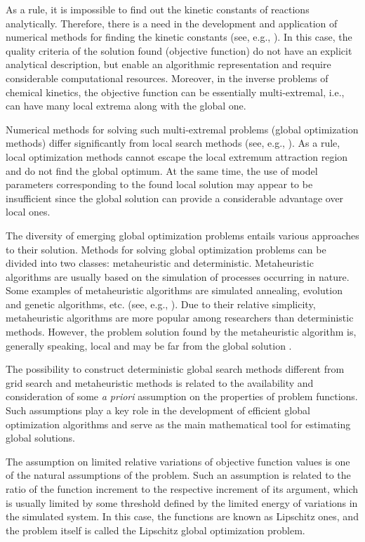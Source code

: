\documentclass{svproc}
\begin{document}
As a rule, it is impossible to find out the kinetic constants of reactions analytically. Therefore, there is a need in the development and application of numerical methods for finding the kinetic constants (see, e.g., \cite{Zaynullin2020,Enikeeva2020,Koledina2019,Enikeev2020,uskovfibrous,enikeeva2021,en13133393}). In this case, the quality criteria of the solution found (objective function) do not have an explicit analytical description, but enable an algorithmic representation and require considerable computational resources. Moreover, in the inverse problems of chemical kinetics, the objective function can be essentially multi-extremal, i.e., can have many local extrema along with the global one. 

Numerical methods for solving such multi-extremal problems (global optimization methods) differ significantly from local search methods (see, e.g., \cite{Sergeyev2017,PaulaviciusZilinskas2014}). As a rule, local optimization methods cannot escape the local extremum attraction region and do not find the global optimum. At the same time, the use of model parameters corresponding to the found local solution may appear to be insufficient since the global solution can provide a considerable advantage over local ones. 

The diversity of emerging global optimization problems entails various approaches to their solution. Methods for solving global optimization problems can be divided into two classes: metaheuristic and deterministic. Metaheuristic algorithms are usually based on the simulation of processes occurring in nature. Some examples of metaheuristic algorithms are simulated annealing, evolution and genetic algorithms, etc. (see, e.g., \cite{Battiti2009,Eiben2015}). Due to their relative simplicity, metaheuristic algorithms are more popular among researchers than deterministic methods. 
However, the problem solution found by the metaheuristic algorithm is, generally speaking, local and may be far from the global solution \cite{Kvasov2018}. 

The possibility to construct deterministic global search methods different from grid search and metaheuristic methods is related to the availability and consideration of some {\it a priori} assumption on the properties of problem functions. Such assumptions play a key role in the development of efficient global optimization algorithms and serve as the main mathematical tool for estimating global solutions.

The assumption on limited relative variations of objective function values is one of the natural assumptions of the problem. Such an assumption is related to the ratio of the function increment to the respective increment of its argument, which is usually limited by some threshold defined by the limited energy of variations in the simulated system. In this case, the functions are known as Lipschitz ones, and the problem itself is called the Lipschitz global optimization problem. 
\end{document}
